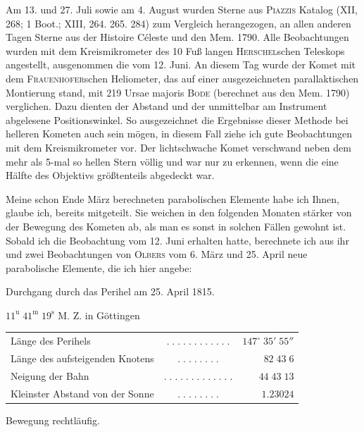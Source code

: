 \par\indent Am 13. und 27. Juli sowie am 4. August wurden Sterne aus \textsc{Piazzis} Katalog (XII, 268; 1 Boot.; XIII, 264. 265. 284) zum Vergleich herangezogen, an allen anderen Tagen Sterne aus der Histoire Céleste und den Mem. 1790. Alle Beobachtungen wurden mit dem Kreismikrometer des 10 Fuß langen \textsc{Herschel}schen Teleskops angestellt, ausgenommen die vom 12. Juni. An diesem Tag wurde der Komet mit dem \textsc{Frauenhofer}schen Heliometer, das auf einer ausgezeichneten parallaktischen Montierung stand, mit 219 Ursae majoris \textsc{Bode} (berechnet aus den Mem. 1790) verglichen. Dazu dienten der Abstand und der unmittelbar am Instrument abgelesene Positionswinkel. So ausgezeichnet die Ergebnisse dieser Methode bei helleren Kometen auch sein mögen, in diesem Fall ziehe ich gute Beobachtungen mit dem Kreismikrometer vor. Der lichtschwache Komet verschwand neben dem mehr als 5-mal so hellen Stern völlig und war nur zu erkennen, wenn die eine Hälfte des Objektivs größtenteils abgedeckt war.

\par\indent Meine schon Ende März berechneten parabolischen Elemente habe ich Ihnen, glaube ich, bereits mitgeteilt. Sie weichen in den folgenden Monaten stärker von der Bewegung des Kometen ab, als man es sonst in solchen Fällen gewohnt ist. Sobald ich die Beobachtung vom 12. Juni erhalten hatte, berechnete ich aus ihr und zwei Beobachtungen von \textsc{Olbers} vom 6. März und 25. April neue parabolische Elemente, die ich hier angebe:

\begin{center}\fontsize{10}{12}\selectfont Durchgang durch das Perihel am 25. April 1815.\par $11^{\mathrm u}\;41^{\mathrm m}\;19^{\mathrm s}$ M. Z. in Göttingen\end{center}
\begin{center}\fontsize{9}{11}\selectfont\setlength{\tabcolsep}{2pt}\renewcommand{\arraystretch}{1.15}\begin{tabular}{lcr}
Länge des Perihels & $.\;.\;.\;.\;.\;.\;.\;.\;.\;.\;.\;.$ & $147^\circ\;35'\;55''$\\
Länge des aufsteigenden Knotens & $.\;.\;.\;.\;.\;.\;.\;.$ & $82\;43\;6$\\
Neigung der Bahn & $.\;.\;.\;.\;.\;.\;.\;.\;.\;.\;.\;.\;.$ & $44\;43\;13$\\
Kleinster Abstand von der Sonne & $.\;.\;.\;.\;.\;.\;.\;.$ & $1.23024$\\
\end{tabular}\end{center}\begin{center}Bewegung rechtläufig.\end{center}

